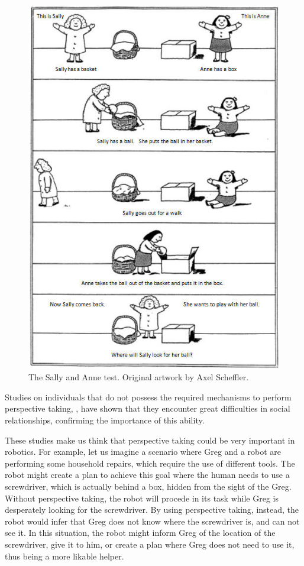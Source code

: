  \begin{figure}[ht!]
	\centering
	\includegraphics[scale=0.45]{img/situation_assessment/sally-anne.jpg}
	\caption{The Sally and Anne test. Original artwork by Axel Scheffler. }
	\label{fig:situation_assessment-sally_anne}
\end{figure}


Studies on individuals that do not possess the required mechanisms to perform perspective taking, \cite{frick2014picturing}, have shown that they encounter great difficulties in social relationships,  confirming the importance of this ability.

These studies make us think that perspective taking could be very important in robotics. For example, let us imagine a scenario where Greg and a robot are performing some household repairs, which require the use of different tools. The robot might create a plan to achieve this goal where the human needs to use a screwdriver, which is actually behind a box, hidden from the sight of the Greg. Without perspective taking, the robot will procede in its task while Greg is desperately looking for the screwdriver. By using perspective taking, instead, the robot would infer that Greg does not know where the screwdriver is, and can not see it. In this situation, the robot might inform Greg of the location of the screwdriver, give it to him, or create a plan where Greg does not need to use it, thus being a more likable helper.


